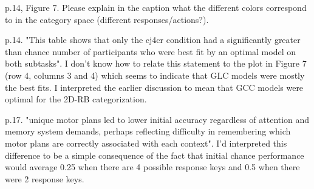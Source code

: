 p.14, Figure 7. Please explain in the caption what the
different colors correspond to in the category space
(different responses/actions?).

p.14. "This table shows that only the cj4cr condition had a
significantly greater than chance number of participants who
were best fit by an optimal model on both subtasks". I don't
know how to relate this statement to the plot in Figure 7
(row 4, columns 3 and 4) which seems to indicate that GLC
models were mostly the best fits. I interpreted the earlier
discussion to mean that GCC models were optimal for the
2D-RB categorization.

p.17. "unique motor plans led to lower initial accuracy
regardless of attention and memory system demands, perhaps
reflecting difficulty in remembering which motor plans are
correctly associated with each context". I'd interpreted
this difference to be a simple consequence of the fact that
initial chance performance would average 0.25 when there are
4 possible response keys and 0.5 when there were 2 response
keys.
